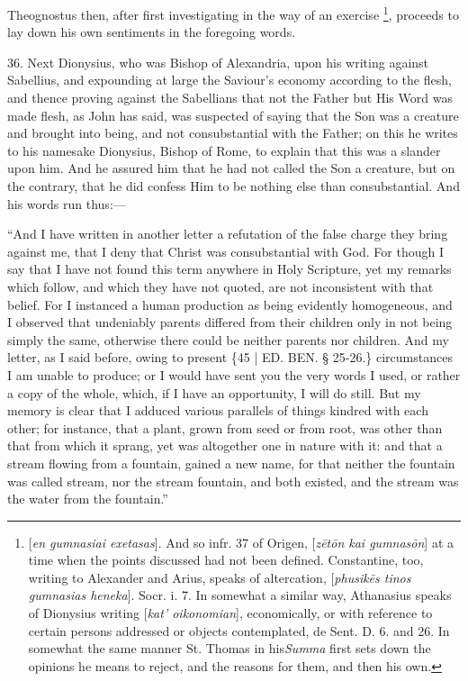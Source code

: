 Theognostus then, after first
investigating in the way of an exercise \footnote{[\emph{en gumnasiai exetasas}]. And so infr. 37 of Origen, [\emph{z\={e}t\={o}n
kai gumnas\={o}n}] at a time when the points discussed had not
been defined. Constantine, too, writing to Alexander and Arius, speaks
of altercation, [\emph{phusik\={e}s tinos gumnasias heneka}]. Socr.
i. 7. In somewhat a similar way, Athanasius speaks of Dionysius
writing [\emph{kat' oikonomian}], economically, or with reference to
certain persons addressed or objects contemplated, de Sent. D. 6. and
26. In somewhat the same manner St. Thomas in his\emph{Summa} first
sets down the opinions he means to reject, and the reasons for them,
and then his own.}, proceeds to lay down his own sentiments in the foregoing
words.

36. Next Dionysius, who was
Bishop of Alexandria, upon his writing against Sabellius, and
expounding at large the Saviour's economy according to the flesh, and
thence proving against the Sabellians that not the Father but His Word
was made flesh, as John has said, was suspected of saying that the Son
was a creature and brought into being, and not consubstantial with the
Father; on this he writes to his namesake Dionysius, Bishop of Rome,
to explain that this was a slander upon him. And he assured him that
he had not called the Son a creature, but on the contrary, that he did
confess Him to be nothing else than consubstantial. And his words run
thus:—


``And I have written in another
letter a refutation of the false charge they bring against me, that I
deny that Christ was consubstantial with God. For though I say that I
have not found this term anywhere in Holy Scripture, yet my remarks
which follow, and which they have not quoted, are not inconsistent
with that belief. For I instanced a human production as being
evidently homogeneous, and I observed that undeniably parents differed
from their children only in not being simply the same, otherwise there
could be neither parents nor children. And my letter, as I said
before, owing to present \{45 | ED. BEN.
§ 25-26.\} circumstances I am unable to produce; or I would have sent
you the very words I used, or rather a copy of the whole, which, if I
have an opportunity, I will do still. But my memory is clear that I
adduced various parallels of things kindred with each other; for
instance, that a plant, grown from seed or from root, was other than
that from which it sprang, yet was altogether one in nature with it:
and that a stream flowing from a fountain, gained a new name, for that
neither the fountain was called stream, nor the stream fountain, and
both existed, and the stream was the water from the fountain.''

